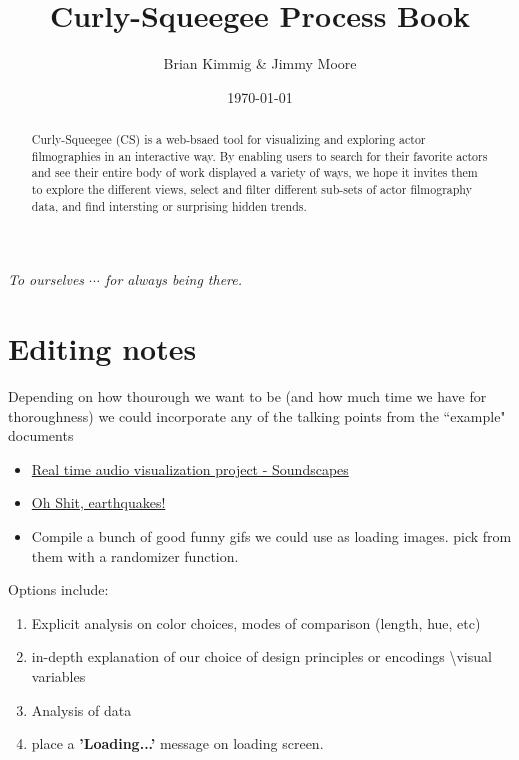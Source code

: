 \documentclass[12pt]{article}
\title{Curly-Squeegee Process Book}
\author{ Brian Kimmig \& Jimmy Moore}
\date{\today}
\begin{document}
\maketitle

\begin{abstract}
	Curly-Squeegee (CS) is a web-bsaed tool for visualizing and exploring actor filmographies in an interactive way. By enabling users to search for their favorite actors and see their entire body of work displayed a variety of ways, we hope it invites them to explore the different views, select and filter different sub-sets of actor filmography data, and find intersting or surprising hidden trends.
\end{abstract}

\newpage

\tableofcontents

\newpage


\begin{center}

	\vspace*{\fill}
	\textit{To ourselves $\cdots$ for always being there.}
	\vspace*{\fill}
	
\end{center}

\newpage 

\section{Editing notes}

{\color{red}

Depending on how thourough we want to be (and how much time we have for thoroughness) we could incorporate any of the talking points from the ``example" documents
\begin{itemize}
	\item \href{http://dataviscourse.net/2015/assets/process_books/bansal_cao_hou.pdf}{Real time audio visualization project - Soundscapes}
	\item \href{http://dataviscourse.net/2015/assets/process_books/walsh_trevino_bett.pdf}{Oh Shit, earthquakes!}
	\item Compile a bunch of good funny gifs we could use as loading images.  pick from them with a randomizer function.
\end{itemize}

Options include:
\begin{enumerate}
	\item Explicit analysis on color choices, modes of comparison (length, hue, etc)
	\item in-depth explanation of our  choice of design principles or encodings \textbackslash visual variables
	\item Analysis of data
	\item place a \textbf{'Loading...'} message on loading screen.
\end{enumerate}
}
\end{document}
